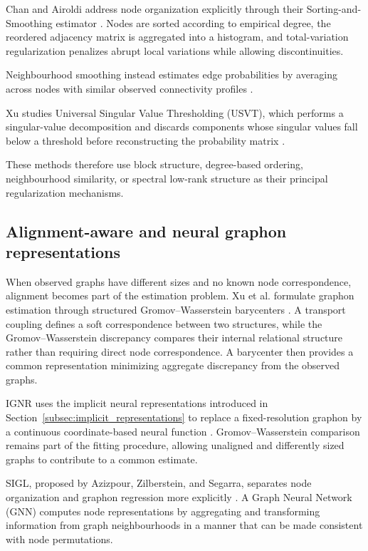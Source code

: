 Chan and Airoldi address node organization explicitly through their Sorting-and-Smoothing estimator \cite{chan2014consistent}. Nodes are sorted according to empirical degree, the reordered adjacency matrix is aggregated into a histogram, and total-variation regularization penalizes abrupt local variations while allowing discontinuities.

Neighbourhood smoothing instead estimates edge probabilities by averaging across nodes with similar observed connectivity profiles \cite{zhang2017estimating}.

Xu studies Universal Singular Value Thresholding (USVT), which performs a singular-value decomposition and discards components whose singular values fall below a threshold before reconstructing the probability matrix \cite{xu2018rates}.

These methods therefore use block structure, degree-based ordering, neighbourhood similarity, or spectral low-rank structure as their principal regularization mechanisms.


\subsection{Alignment-aware and neural graphon representations}
\label{subsec:rw_neural_graphon_estimators}

When observed graphs have different sizes and no known node correspondence, alignment becomes part of the estimation problem. Xu et al. formulate graphon estimation through structured Gromov--Wasserstein barycenters \cite{xu2021structured}. A transport coupling defines a soft correspondence between two structures, while the Gromov--Wasserstein discrepancy compares their internal relational structure rather than requiring direct node correspondence. A barycenter then provides a common representation minimizing aggregate discrepancy from the observed graphs.

IGNR uses the implicit neural representations introduced in Section~\ref{subsec:implicit_representations} to replace a fixed-resolution graphon by a continuous coordinate-based neural function \cite{xia2023implicit}. Gromov--Wasserstein comparison remains part of the fitting procedure, allowing unaligned and differently sized graphs to contribute to a common estimate.

SIGL, proposed by Azizpour, Zilberstein, and Segarra, separates node organization and graphon regression more explicitly \cite{azizpour2025scalable}. A Graph Neural Network (GNN) computes node representations by aggregating and transforming information from graph neighbourhoods in a manner that can be made consistent with node permutations.

